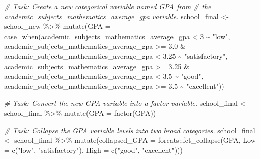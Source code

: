 \documentclass[
]{book}
\newenvironment{Shaded}{\begin{snugshade}}{\end{snugshade}}
\newcommand{\AttributeTok}[1]{\textcolor[rgb]{0.77,0.63,0.00}{#1}}
\newcommand{\CommentTok}[1]{\textcolor[rgb]{0.56,0.35,0.01}{\textit{#1}}}
\newcommand{\DecValTok}[1]{\textcolor[rgb]{0.00,0.00,0.81}{#1}}
\newcommand{\FloatTok}[1]{\textcolor[rgb]{0.00,0.00,0.81}{#1}}
\newcommand{\FunctionTok}[1]{\textcolor[rgb]{0.00,0.00,0.00}{#1}}
\newcommand{\NormalTok}[1]{#1}
\newcommand{\OtherTok}[1]{\textcolor[rgb]{0.56,0.35,0.01}{#1}}
\newcommand{\SpecialCharTok}[1]{\textcolor[rgb]{0.00,0.00,0.00}{#1}}
\newcommand{\StringTok}[1]{\textcolor[rgb]{0.31,0.60,0.02}{#1}}
\begin{document}
\begin{Shaded}
\begin{Highlighting}[]
\CommentTok{\# Task: Create a new categorical variable named \textquotesingle{}GPA\textquotesingle{} from }
\CommentTok{\# the \textquotesingle{}academic\_subjects\_mathematics\_average\_gpa\textquotesingle{} variable.}
\NormalTok{school\_final }\OtherTok{\textless{}{-}}\NormalTok{ school\_new }\SpecialCharTok{\%\textgreater{}\%} 
  \FunctionTok{mutate}\NormalTok{(}\AttributeTok{GPA =} \FunctionTok{case\_when}\NormalTok{(academic\_subjects\_mathematics\_average\_gpa }\SpecialCharTok{\textless{}} \DecValTok{3} \SpecialCharTok{\textasciitilde{}} \StringTok{"low"}\NormalTok{,}
\NormalTok{                         academic\_subjects\_mathematics\_average\_gpa }\SpecialCharTok{\textgreater{}=} \FloatTok{3.0} \SpecialCharTok{\&}\NormalTok{ academic\_subjects\_mathematics\_average\_gpa }\SpecialCharTok{\textless{}} \FloatTok{3.25} \SpecialCharTok{\textasciitilde{}} \StringTok{"satisfactory"}\NormalTok{,}
\NormalTok{                         academic\_subjects\_mathematics\_average\_gpa }\SpecialCharTok{\textgreater{}=} \FloatTok{3.25} \SpecialCharTok{\&}\NormalTok{ academic\_subjects\_mathematics\_average\_gpa }\SpecialCharTok{\textless{}} \FloatTok{3.5} \SpecialCharTok{\textasciitilde{}} \StringTok{"good"}\NormalTok{,}
\NormalTok{                         academic\_subjects\_mathematics\_average\_gpa }\SpecialCharTok{\textgreater{}=} \FloatTok{3.5} \SpecialCharTok{\textasciitilde{}} \StringTok{"excellent"}\NormalTok{))}
\end{Highlighting}
\end{Shaded}

\begin{Shaded}
\begin{Highlighting}[]
\CommentTok{\# Task: Convert the new GPA variable into a factor variable.}
\NormalTok{school\_final }\OtherTok{\textless{}{-}}\NormalTok{ school\_final }\SpecialCharTok{\%\textgreater{}\%} \FunctionTok{mutate}\NormalTok{(}\AttributeTok{GPA =} \FunctionTok{factor}\NormalTok{(GPA))}
\end{Highlighting}
\end{Shaded}

\begin{Shaded}
\begin{Highlighting}[]
\CommentTok{\# Task: Collapse the GPA variable levels into two broad categories.}
\NormalTok{school\_final }\OtherTok{\textless{}{-}}\NormalTok{ school\_final }\SpecialCharTok{\%\textgreater{}\%} 
  \FunctionTok{mutate}\NormalTok{(}\AttributeTok{collapsed\_GPA =}\NormalTok{ forcats}\SpecialCharTok{::}\FunctionTok{fct\_collapse}\NormalTok{(GPA,}
                                               \AttributeTok{Low =} \FunctionTok{c}\NormalTok{(}\StringTok{"low"}\NormalTok{, }\StringTok{"satisfactory"}\NormalTok{),}
                                               \AttributeTok{High =} \FunctionTok{c}\NormalTok{(}\StringTok{"good"}\NormalTok{, }\StringTok{"excellent"}\NormalTok{)))}
\end{Highlighting}
\end{Shaded}
\end{document}
